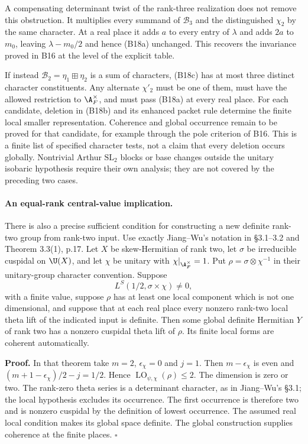A compensating determinant twist of the rank-three realization
does not remove this obstruction. It multiplies every summand
of $\mathcal B_3$ and the distinguished $\chi_2$ by the same
character. At a real place it adds $a$ to every entry of
$\lambda$ and adds $2a$ to $m_0$, leaving
$\lambda-m_0/2$ and hence (B18a) unchanged. This recovers the
invariance proved in B16 at the level of the explicit table.

If instead $\mathcal B_2=\eta_1\boxplus\eta_2$ is a sum of
characters, (B18c) has at most three distinct character
constituents. Any alternate $\chi'_2$ must be one of them,
must have the allowed restriction to $\A_F^\times$, and must
pass (B18a) at every real place. For each candidate, deletion
in (B18b) and its enhanced packet rule determine the finite
local smaller representation. Coherence and global occurrence
remain to be proved for that candidate, for example through
the pole criterion of B16. This is a finite list of specified
character tests, not a claim that every deletion occurs globally.
Nontrivial Arthur $\mathrm{SL}_2$ blocks or base changes outside
the unitary isobaric hypothesis require their own analysis;
they are not covered by the preceding two cases.

\paragraph{An equal-rank central-value implication.}
There is also a precise sufficient condition for constructing a
new definite rank-two group from rank-two input. Use exactly
Jiang--Wu's notation in \S3.1--3.2 and Theorem 3.3(1), p.17.
Let $X$ be skew-Hermitian of rank two, let $\sigma$ be irreducible
cuspidal on $\U(X)$, and let $\chi$ be unitary with
$\chi|_{\A_F^\times}=1$.
Put $\rho=\sigma\otimes\chi^{-1}$ in their unitary-group
character convention. Suppose
\[
 L^S(1/2,\sigma\times\chi)\ne0,
 \tag{B18d}
\]
with a finite value, suppose $\rho$ has at least one local
component which is not one dimensional, and suppose that
at each real place every nonzero rank-two local theta lift
of the indicated input is definite. Then some global definite
Hermitian $Y$ of rank two has a nonzero cuspidal theta lift of
$\rho$. Its finite local forms are coherent automatically.

\textbf{Proof.}
In that theorem take $m=2$, $\epsilon_\chi=0$ and $j=1$.
Then $m-\epsilon_\chi$ is even and
$(m+1-\epsilon_\chi)/2-j=1/2$. Hence
$\operatorname{LO}_{\psi,\chi}(\rho)\leq2$.
The dimension is zero or two. The rank-zero theta series is
a determinant character, as in Jiang--Wu's \S3.1; the local
hypothesis excludes its occurrence. The first occurrence is
therefore two and is nonzero cuspidal by the definition of
lowest occurrence. The assumed real local condition makes its
global space definite. The global construction supplies
coherence at the finite places. \hfill$\square$

